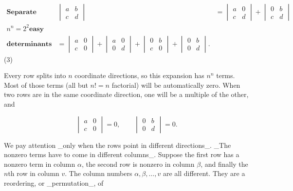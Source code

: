 \[\begin{array}{ll}\textbf{Separate into}&\begin{vmatrix}a&b\\ c&d\end{vmatrix}&=\begin{vmatrix}a&0\\ c&d\end{vmatrix}+\begin{vmatrix}0&b\\ c&d\end{vmatrix}\\ n^{n}=2^{2}\textbf{easy}&\\ \textbf{determinants}&=\begin{vmatrix}a&0\\ c&0\end{vmatrix}+\begin{vmatrix}a&0\\ 0&d\end{vmatrix}+\begin{vmatrix}0&b\\ c&0\end{vmatrix}+\begin{vmatrix}0&b\\ 0&d\end{vmatrix}.\end{array}\] (3)

Every row splits into \(n\) coordinate directions, so this expansion has \(n^{n}\) terms. Most of those terms (all but \(n!=n\) factorial) will be automatically zero. When two rows are in the same coordinate direction, one will be a multiple of the other, and

\[\begin{vmatrix}a&0\\ c&0\end{vmatrix}=0,\qquad\begin{vmatrix}0&b\\ 0&d\end{vmatrix}=0.\]

We pay attention _only when the rows point in different directions_. _The nonzero terms have to come in different columns_. Suppose the first row has a nonzero term in column \(\alpha\), the second row is nonzero in column \(\beta\), and finally the \(n\)th row in column \(v\). The column numbers \(\alpha,\beta,\ldots,v\) are all different. They are a reordering, or _permutation_, of 